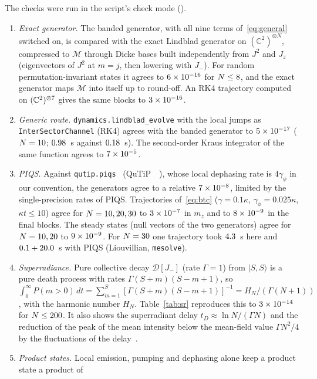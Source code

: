 \documentclass[11pt]{article}
\newcommand{\C}{\mathbb{C}}
\newcommand{\M}{\mathcal{M}}
\newcommand{\D}{\mathcal{D}}
\newcommand{\code}[1]{\nolinkurl{#1}}
\begin{document}
The checks were run in the script's check mode (\PMDevice).
\begin{enumerate}\itemsep1pt
\item[(A1)] \emph{Exact generator.} The banded generator, with all nine terms of~\eqref{eq:general} switched on, is
compared with the exact Lindblad generator on $(\C^2)^{\otimes N}$, compressed to $\M$ through Dicke bases built
independently from $J^2$ and $J_z$ (eigenvectors of $J^2$ at $m=j$, then lowering with $J_-$). For random
permutation-invariant states it agrees to $6\times10^{-16}$ for $N\le8$, and the exact generator maps $\M$ into
itself up to round-off. An RK4 trajectory computed on $(\C^2)^{\otimes\PMTrajN}$ gives the same blocks to
$3\times10^{-16}$.
\item[(A2)] \emph{Generic route.} \code{dynamics.lindblad_evolve} with the local jumps as \code{InterSectorChannel}
(RK4) agrees with the banded generator to $5\times10^{-17}$ ($N=10$; $0.98$~s against $0.18$~s).
The second-order Kraus integrator of the same function agrees to $7\times10^{-5}$.
\item[(A3)] \emph{PIQS.} Against \texttt{qutip.piqs}~\cite{shammah2018} (QuTiP~\PMPiqsVersion~\cite{lambert2026}), whose
local dephasing rate is $4\gamma_\phi$ in our convention, the generators agree to a relative $7\times10^{-8}$, limited by
the single-precision rates of PIQS. Trajectories of~\eqref{eq:btc} ($\gamma=0.1\kappa$, $\gamma_\phi=0.025\kappa$,
$\kappa t\le10$) agree for $N=10, 20, 30$ to $3\times10^{-7}$ in $m_z$ and to $8\times10^{-9}$ in the final blocks.
The steady states (null vectors of the two generators) agree for $N=10, 20$ to $9\times10^{-9}$. For $N=30$
one trajectory took $4.3$~s here and $0.1+20.0$~s with PIQS (Liouvillian,
\texttt{mesolve}).
\item[(A4)] \emph{Superradiance.} Pure collective decay $\D[J_-]$ (rate $\Gamma=1$) from $|S,S\rangle$ is a pure death
process with rates $\Gamma(S+m)(S-m+1)$, so $\int_0^\infty P(m>0)\,dt=\sum_{m=1}^S[\Gamma(S+m)(S-m+1)]^{-1}=
H_N/(\Gamma(N+1))$, with the harmonic number $H_N$. Table~\ref{tab:sr} reproduces this to $3\times10^{-14}$ for
$N\le200$. It also shows the superradiant delay $t_D\approx\ln N/(\Gamma N)$ and the reduction of the peak of
the mean intensity below the mean-field value $\Gamma N^2/4$ by the fluctuations of the delay~\cite{dicke1954,gross1982}.
\item[(A5)] \emph{Product states.} Local emission, pumping and dephasing alone keep a product state a product of

\end{enumerate}
\end{document}
